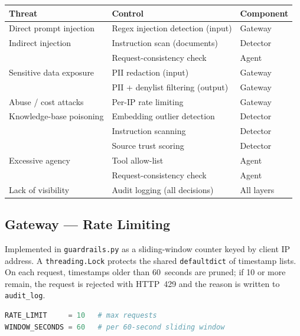 \documentclass[11pt,a4paper]{article}
\begin{document}
\begin{center}
\begin{tabular}{p{4cm} p{5.5cm} l}
\toprule
\textbf{Threat} & \textbf{Control} & \textbf{Component} \\
\midrule
Direct prompt injection   & Regex injection detection (input)          & Gateway \\
Indirect injection        & Instruction scan (documents)               & Detector \\
                          & Request-consistency check                  & Agent \\
Sensitive data exposure   & PII redaction (input)                      & Gateway \\
                          & PII + denylist filtering (output)          & Gateway \\
Abuse / cost attacks      & Per-IP rate limiting                       & Gateway \\
Knowledge-base poisoning  & Embedding outlier detection                & Detector \\
                          & Instruction scanning                       & Detector \\
                          & Source trust scoring                       & Detector \\
Excessive agency          & Tool allow-list                            & Agent \\
                          & Request-consistency check                  & Agent \\
Lack of visibility        & Audit logging (all decisions)              & All layers \\
\bottomrule
\end{tabular}
\end{center}

\subsection{Gateway --- Rate Limiting}

Implemented in \texttt{guardrails.py} as a sliding-window counter keyed by
client IP address. A \texttt{threading.Lock} protects the shared
\texttt{defaultdict} of timestamp lists. On each request, timestamps older than
60~seconds are pruned; if 10 or more remain, the request is rejected with
HTTP~429 and the reason is written to \texttt{audit\_log}.

\begin{lstlisting}[language=Python]
RATE_LIMIT     = 10   # max requests
WINDOW_SECONDS = 60   # per 60-second sliding window
\end{lstlisting}
\end{document}
